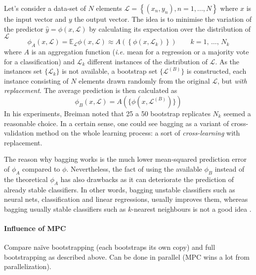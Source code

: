 Let's consider a data-set of $N$ elements $\mathcal{L}=\left\{ \left( x_n,y_n\right),n=1,...,N\right\}$ where $x$ is the input vector and $y$ the output vector. The idea is to minimise the variation of the predictor $\hat{y}=\phi\left(x,\mathcal{L}\right)$ by calculating its expectation over the distribution of $\mathcal{L}$
\begin{equation}
    \phi_A\left(x,\mathcal{L}\right) = \mathbb{E}_\mathcal{L} \phi\left(x,\mathcal{L}\right) \approx A \left( \left\{ \phi\left(x,\mathcal{L}_k\right) \right\} \right) \qquad k=1,\, \ldots,\, N_k
\end{equation}
where $A$ is an aggregation function (\emph{i.e.} mean for a regression or a majority vote for a classification) and $\mathcal{L}_k$ different instances of the distribution of $\mathcal{L}$. As the instances set $\{ \mathcal{L}_k \}$ is not available, a bootstrap set $\{\mathcal{L}^{(B)}\}$ is constructed, each instance consisting of $N$ elements drawn randomly from the original $\mathcal{L}$, but \emph{with replacement}. The average prediction is then calculated as
\begin{equation}
    \phi_B\left(x,\mathcal{L}\right) = A(\{ \phi(x,\mathcal{L}^{(B)}) \})
\end{equation}
In his experiments, Breiman noted that 25 a 50 bootstrap replicates $N_k$ seemed a reasonable choice. In a certain sense, one could see bagging as a variant of cross-validation method on the whole learning process: a sort of \emph{cross-learning} with replacement.

The reason why bagging works is the much lower mean-squared prediction error of $\phi_A$ compared to $\phi$. Nevertheless, the fact of using the available $\phi_B$ instead of the theoretical $\phi_A$ has also drawbacks as it can deteriorate the prediction of already stable classifiers. In other words, bagging unstable classifiers such as neural nets, classification and linear regressions, usually improves them, whereas bagging usually stable classifiers such as $k$-nearest neighbours is not a good idea \cite{Breiman1996HeuristicsSelection}.

\paragraph{Influence of MPC}
Compare naïve bootstrapping (each bootstraps its own copy) and full bootstrapping as described above. Can be done in parallel (MPC wins a lot from parallelization).

